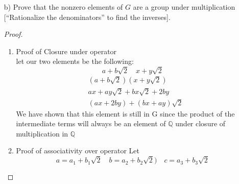 \documentclass[11pt]{article}
\theoremstyle{definition}  %
\begin{document}
\begin{enumerate}
\begin{itemize}
\begin{proof}
\begin{enumerate}
      \begin{align*}
        &(a+b)+c=a+(b+c)\\
        &(a_1+b_1\sqrt{2}+a_2+b_2\sqrt{2})+a_3+b_3\sqrt{2}=a_1+(b_1\sqrt{2}+a_2+b_2\sqrt{2}+a_3+b_3\sqrt{2})\\
        &a_1+b_1\sqrt{2}+a_2+b_2\sqrt{2}+a_3+b_3\sqrt{2}=a_1+b_1\sqrt{2}+a_2+b_2\sqrt{2}+a_3+b_3\sqrt{2}
      \end{align*}
      \item Proof of existence of identity element
      Let $a=b=0$ this the we have $0+0\sqrt{2}\in G$ which implies that $\forall g\in G g+0=g$ Which means that 0 is our identity element.
      \item  Proof of existence of inverse of operator\\
      To identify the inverse of this group we need some value who when summed with a given $g\inG$ returns us to the identity. That value is the following: let$g=a+b\sqrt{2}$, the inverse would then be the following element
      \[
        -a-b\sqrt{2}
      \]
      as :
      \[
        a+b\sqrt{2}+(-a-b\sqrt{2})=0
      \]
    \end{enumerate}
    Thus the set G and the binary operation of addition form a group
  \end{proof}
   \item[b)] Prove that the nonzero elements of $G$ are a group under multiplication [``Rationalize the denominators'' to find the inverses].
   \begin{proof}
     \begin{enumerate}
       \item Proof of Closure under operator\\
        let our two elements be the following:
        \[
          a+b\sqrt{2}\quad x+y\sqrt{2}
        \]
        \begin{align*}
            &(a+b\sqrt{2})(x+y\sqrt{2})\\
            &ax+ay\sqrt{2}+bx\sqrt{2}+2by\\
            &(ax+2by)+(bx+ay)\sqrt{2}
        \end{align*}
        We have shown that this element is still in G since the product of the intermediate terms will always be an element of $\mathbb{Q}$ under closure of multiplication in $\mathbb{Q}$
       \item Proof of associativity over operator
       Let
       \[
         a=a_1+b_1\sqrt{2}\quad b=a_2+b_2\sqrt{2})\quad c= a_3+b_3\sqrt{2}
\]
\end{enumerate}
\end{proof}
\end{itemize}
\end{enumerate}
\end{document}

